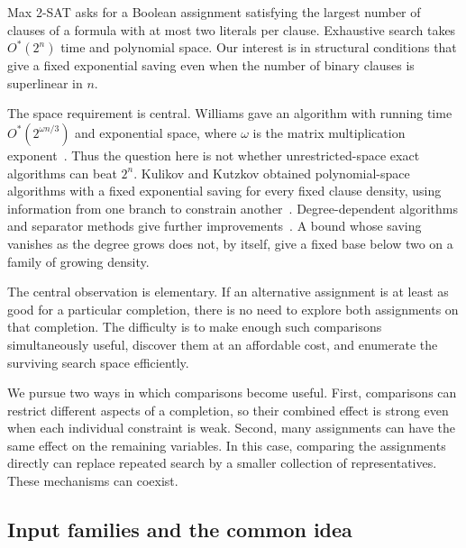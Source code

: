 \documentclass[11pt,a4paper]{article}
\theoremstyle{definition}
\theoremstyle{remark}
\newcommand{\Ostar}{O^{*}}
\begin{document}
Max 2-SAT asks for a Boolean assignment satisfying the largest number of
clauses of a formula with at most two literals per clause. Exhaustive search
takes $\Ostar(2^n)$ time and polynomial space. Our interest is in structural
conditions that give a fixed exponential saving even when the number of
binary clauses is superlinear in $n$.

The space requirement is central. Williams gave an algorithm with running
time $\Ostar(2^{\omega n/3})$ and exponential space, where $\omega$ is the
matrix multiplication exponent~\cite{Williams}. Thus the question here is
not whether unrestricted-space exact algorithms can beat $2^n$.
Kulikov and Kutzkov obtained polynomial-space algorithms with a fixed
exponential saving for every fixed clause density, using information from
one branch to constrain another~\cite{KK}. Degree-dependent algorithms and
separator methods give further improvements~\cite{GK}. A bound whose saving
vanishes as the degree grows does not, by itself, give a fixed base below two
on a family of growing density.

The central observation is elementary. If an alternative assignment is at
least as good for a particular completion, there is no need to explore both
assignments on that completion. The difficulty is to make enough such
comparisons simultaneously useful, discover them at an affordable cost,
and enumerate the surviving search space efficiently.

We pursue two ways in which comparisons become useful. First, comparisons
can restrict different aspects of a completion, so their combined effect is
strong even when each individual constraint is weak. Second, many assignments
can have the same effect on the remaining variables. In this case, comparing
the assignments directly can replace repeated search by a smaller collection
of representatives. These mechanisms can coexist.

\subsection{Input families and the common idea}
\end{document}

